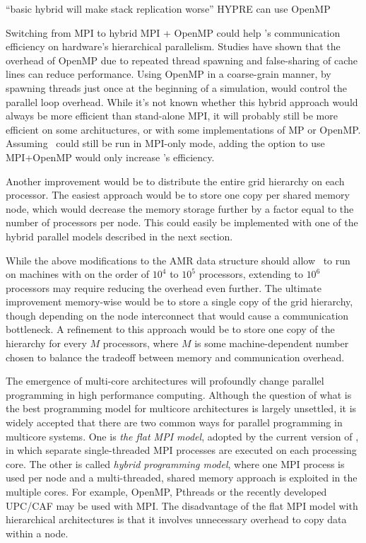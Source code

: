 \documentclass{article}
\begin{document}
   ``basic hybrid will make stack replication worse''
   HYPRE can use OpenMP

  Switching from MPI to hybrid MPI + OpenMP could help \enzo's
  communication efficiency on hardware's hierarchical parallelism.
  Studies have shown that the overhead of OpenMP due to repeated
  thread spawning and false-sharing of cache lines can reduce
  performance.  Using OpenMP in a coarse-grain manner, by spawning
  threads just once at the beginning of a simulation, would control
  the parallel loop overhead.  While it's not known whether this
  hybrid approach would always be more efficient than stand-alone MPI,
  it will probably still be more efficient on some archituctures, or
  with some implementations of MP or OpenMP.  Assuming \enzo\ could
  still be run in MPI-only mode, adding the option to use MPI+OpenMP
  would only increase \enzo's efficiency.

  Another improvement would be to distribute the entire grid hierarchy
  on each processor.  The easiest approach would be to store one copy
  per shared memory node, which would decrease the memory storage
  further by a factor equal to the number of processors per node. This
  could easily be implemented with one of the hybrid parallel models
  described in the next section.

   While the above modifications to the AMR data structure should allow
   \enzo\ to run on machines with on the order of $10^4$ to $10^5$
   processors, extending to $10^6$ processors may require reducing the
   overhead even further.  The ultimate improvement memory-wise would
   be to store a single copy of the grid hierarchy, though depending
   on the node interconnect that would cause a communication
   bottleneck.  A refinement to this approach would be to store one
   copy of the hierarchy for every $M$ processors, where $M$ is some
   machine-dependent number chosen to balance the tradeoff between
   memory and communication overhead.

  The emergence of multi-core architectures will profoundly change
  parallel programming in high performance computing. Although the
  question of what is the best programming model for multicore
  architectures is largely unsettled, it is widely accepted that there
  are two common ways for parallel programming in multicore systems.
  One is \emph{the flat MPI model}, adopted by the current version of
  \enzo, in which separate single-threaded MPI processes are executed
  on each processing core. The other is called \emph{hybrid
  programming model}, where one MPI process is used per node and a
  multi-threaded, shared memory approach is exploited in the multiple
  cores. For example, OpenMP, Pthreads or the recently developed
  UPC/CAF may be used with MPI.  The disadvantage of the flat MPI
  model with hierarchical architectures is that it involves
  unnecessary overhead to copy data within a node.
\end{document}
